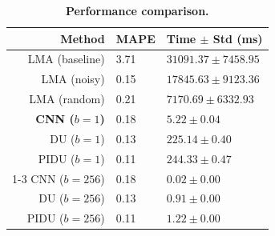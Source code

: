 \begin{table}[t]
\centering
\small
\caption{\textbf{Performance comparison.}}
\label{tab:timings_case1}
\begin{tabular}{rll}
\toprule
\textbf{Method} & \textbf{MAPE} & \textbf{Time $\pm$ Std (ms)} \\
\midrule
LMA (baseline) & 3.71 & $31091.37 \pm 7458.95$ \\
LMA (noisy) & 0.15 & $17845.63 \pm 9123.36$ \\
LMA (random) & 0.21 & $7170.69 \pm 6332.93$ \\
\textbf{CNN ($b=1$)} & 0.18 & $\mathbf{5.22 \pm 0.04}$ \\
DU ($b=1$) & 0.13 & $225.14 \pm 0.40$ \\
PIDU ($b=1$) & 0.11 & $244.33 \pm 0.47$ \\
\cmidrule{1-3}
CNN ($b=256$) & 0.18 & $0.02 \pm 0.00$ \\
DU ($b=256$) & 0.13 & $0.91 \pm 0.00$ \\
PIDU ($b=256$) & 0.11 & $1.22 \pm 0.00$ \\
\bottomrule
\end{tabular}
\end{table}
